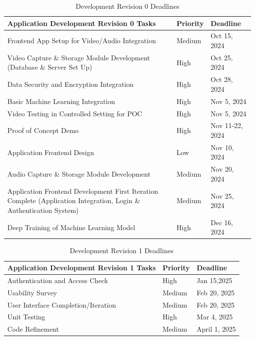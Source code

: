 \documentclass[12pt]{article}
\begin{document}
\begin{table}[H]
  \caption{Development Revision 0 Deadlines}
  \label{tab:rev0}
  \begin{tabularx}{\textwidth}{|p{8cm}|p{2cm}|X|}
  \hline
  \textbf{Application Development Revision 0 Tasks} & \textbf{Priority} &  \textbf{Deadline} \\
  \hline
  Frontend App Setup for Video/Audio Integration & Medium &  Oct 15, 2024 \\
  \hline
  Video Capture \& Storage Module Development (Database \& Server Set Up) & High &  Oct 25, 2024 \\
  \hline
  Data Security and Encryption Integration & High & Oct 28, 2024 \\
  \hline
  Basic Machine Learning Integration & High & Nov 5, 2024 \\
  \hline
  Video Testing in Controlled Setting for POC & High & Nov 5, 2024 \\
  \hline
  Proof of Concept Demo & High & Nov 11-22, 2024 \\
  \hline
  Application Frontend Design & Low & Nov 10, 2024 \\
  \hline
  Audio Capture \& Storage Module Development & Medium & Nov 20, 2024 \\
  \hline
  Application Frontend Development First Iteration Complete (Application Integration, Login \& Authentication System) & Medium & Nov 25, 2024 \\
  \hline
  Deep Training of Machine Learning Model & High & Dec 16, 2024 \\
  \hline
  \end{tabularx}
\end{table}

\begin{table}[H]
  \caption{Development Revision 1 Deadlines}
  \label{tab:rev1}
  \begin{tabularx}{\textwidth}{|p{8cm}|p{2cm}|X|}
  \hline
  \textbf{Application Development Revision 1 Tasks} & \textbf{Priority} & \textbf{Deadline} \\
  \hline
  Authentication and Access Check & High & Jan 15,2025 \\
  \hline 
  Usability Survey & Medium & Feb 20, 2025 \\
  \hline 
  User Interface Completion/Iteration & Medium & Feb 20, 2025 \\
  \hline 
  Unit Testing & High & Mar 4, 2025 \\
  \hline 
  Code Refinement & Medium & April 1, 2025 \\
  \hline
  \end{tabularx}
\end{table}
\end{document}
